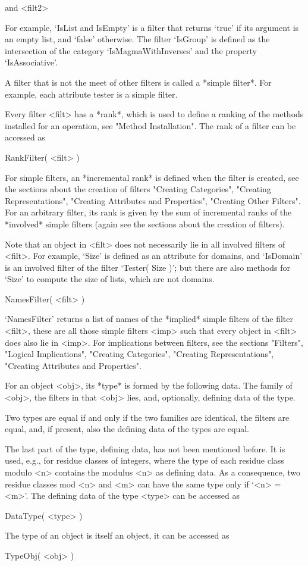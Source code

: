  and <filt2>

For example, `IsList and IsEmpty' is a filter that returns `true'
if its argument is an empty list, and `false' otherwise.
The filter `IsGroup' is defined as the intersection of the category
`IsMagmaWithInverses' and the property `IsAssociative'.

A filter that is not the meet of other filters
is called a *simple filter*.
For example, each attribute tester is a simple filter.

Every filter <filt> has a *rank*, which is used to define a ranking of
the methods installed for an operation, see "Method Installation".
The rank of a filter can be accessed as

\>RankFilter( <filt> )

For simple filters, an *incremental rank* is defined when the filter is
created, see the sections about the creation of filters
"Creating Categories", "Creating Representations",
"Creating Attributes and Properties", "Creating Other Filters".
For an arbitrary filter, its rank is given by the sum of incremental
ranks of the *involved* simple filters (again see the sections about the
creation of filters).

Note that an object in <filt> does not necessarily lie in all involved
filters of <filt>.
For example, `Size' is defined as an attribute for domains,
and `IsDomain' is an involved filter of the filter `Tester( Size )';
but there are also methods for `Size' to compute the size of lists,
which are not domains.

\>NamesFilter( <filt> )

`NamesFilter' returns a list of names of the *implied* simple filters
of the filter <filt>, these are all those simple filters <imp> such that
every object in <filt> does also lie in <imp>.
For implications between filters, see the sections "Filters",
"Logical Implications", "Creating Categories",
"Creating Representations", "Creating Attributes and Properties".



For an object <obj>, its *type* is formed by the following data.
The family of <obj>,
the filters in that <obj> lies,
and, optionally, defining data of the type.

Two types are equal if and only if the two families are identical,
the filters are equal, and, if present, also the defining data of the
types are equal.

The last part of the type, defining data, has not been mentioned before.
It is used, e.g., for residue classes of integers, where the type of each
residue class modulo <n> contains the modulus <n> as defining data.
As a consequence, two residue classes mod <n> and <m> can have the same
type only if `<n> = <m>'.
The defining data of the type <type> can be accessed as

\>DataType( <type> )

The type of an object is itself an object,
it can be accessed as

\>TypeObj( <obj> )

